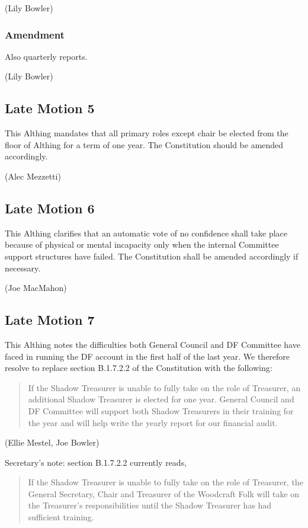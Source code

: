 \documentclass[a4paper, 11pt]{article} %
\begin{document}
(Lily Bowler)

\subsubsection{Amendment}
Also quarterly reports.

(Lily Bowler)

\subsection{Late Motion 5}

This Althing mandates that all primary roles except chair be elected from the floor of Althing for a term of one year.  The Constitution should be amended accordingly.

(Alec Mezzetti)

\subsection{Late Motion 6}

This Althing clarifies that an automatic vote of no confidence shall take place because of physical or mental incapacity only when the internal Committee support structures have failed.  The Constitution shall be amended accordingly if necessary.

(Joe MacMahon)

\subsection{Late Motion 7}

This Althing notes the difficulties both General Council and DF Committee have faced in running the DF account in the first half of the last year.  We therefore resolve to replace section B.1.7.2.2 of the Constitution with the following:

\begin{quote}
If the Shadow Treasurer is unable to fully take on the role of Treasurer, an additional Shadow Treasurer is elected for one year.  General Council and DF Committee will support both Shadow Treasurers in their training for the year and will help write the yearly report for our financial audit.
\end{quote}

(Ellie Mestel, Joe Bowler)

Secretary's note: section B.1.7.2.2 currently reads, 
\begin{quote}
If the Shadow Treasurer is unable to fully take on the role of Treasurer, the General Secretary, Chair and Treasurer of the Woodcraft Folk will take on the Treasurer’s responsibilities until the Shadow Treasurer has had sufficient training.
\end{quote}
\end{document}
